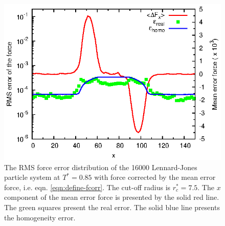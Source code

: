 \documentclass[aps,pre,preprint]{revtex4}
\begin{document}

\begin{figure}
  \centering
  \includegraphics[]{fig/t0.85-n16000-fcorr-rc07.5-feq0200/fcorr.and.error.eps}
  \caption{ The RMS force error distribution of the 16000
    Lennard-Jones particle system at $T^\ast=0.85$ with force
    corrected by the mean error force,
    i.e. eqn. \eqref{eqn:define-fcorr}. The cut-off radius is $r^\ast_c =
    7.5$. The $x$ component of the mean error force is presented by
    the solid red line. The green squares present the real error. The
    solid blue line presents the homogeneity error. }
  \label{fig:tmp4}
\end{figure}


\end{document}
